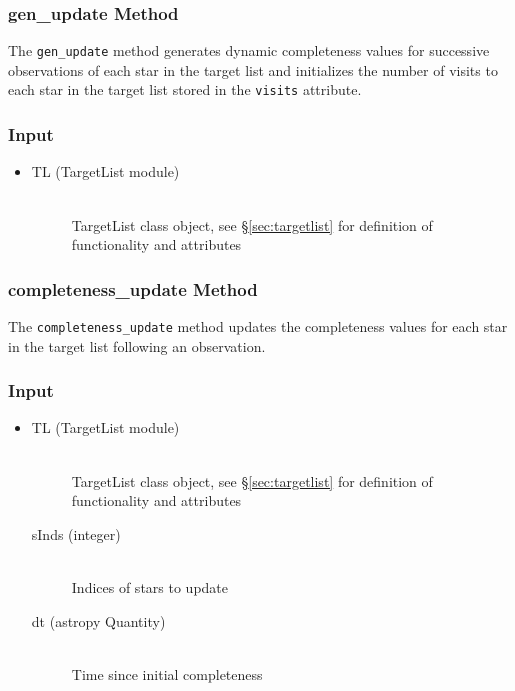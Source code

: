 \documentclass[cleanfoot]{asme2ej}
\begin{document}
\subsubsection{gen\_update Method} \label{sec:genupdatetask}
The \verb+gen_update+ method generates dynamic completeness values for successive observations of each star in the target list and initializes the number of visits to each star in the target list stored in the \verb+visits+ attribute.

\subsubsection*{Input}
\begin{itemize}
\item 
\begin{description}
    \item[TL (TargetList module)] \hfill \\ TargetList class object, see \S\ref{sec:targetlist} for definition of functionality and attributes
\end{description}
\end{itemize}

\subsubsection{completeness\_update Method}
\label{sec:completenessupdatetask}
The \verb+completeness_update+ method updates the completeness values for each star in the target list following an observation.

\subsubsection*{Input}
\begin{itemize}
\item 
\begin{description}
    \item[TL (TargetList module)] \hfill \\ TargetList class object, see \S\ref{sec:targetlist} for definition of functionality and attributes
    \item[sInds (integer)] \hfill \\ Indices of stars to update
    \item[dt (astropy Quantity)] \hfill \\ Time since initial completeness
\end{description}
\end{itemize}
\end{document}
